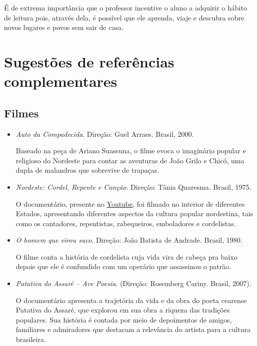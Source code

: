 \documentclass[12pt]{extarticle}
\begin{document}
É de extrema importância que o professor incentive o aluno a adquirir o hábito
de leitura pois, através dela, é possível que ele aprenda, viaje e descubra
sobre novos lugares e povos sem sair de casa.

\section{Sugestões de referências complementares}\label{sugestoes}

\subsection{Filmes}

\begin{itemize}

\item \textit{Auto da Compadecida}. Direção: Guel Arraes. Brasil, 2000.

Baseado na peça de Ariano Suassuna, o filme evoca o imaginário popular
e religioso do Nordeste para contar as aventuras de João Grilo e Chicó, uma
dupla de malandros que sobrevive de trapaças.

\item \textit{Nordeste: Cordel, Repente e Canção}. Direção: Tânia Quaresma.
  Brasil, 1975.

O documentário, presente no
\href{https://www.youtube.com/watch?v=xFOZxwBcUmo}{Youtube}, foi filmado no
interior de diferentes Estados, apresentando diferentes aspectos da cultura
popular nordestina, tais como os cantadores, repentistas, rabequeiros,
emboladores e cordelistas.

\item \textit{O homem que virou suco}. Direção: João Batista de Andrade.
  Brasil, 1980.

O filme conta a história de cordelista cuja vida vira de cabeça pra baixo
depois que ele é confundido com um operário que assassinou o patrão.

\item \textit{Patativa do Assaré -- Ave Poesia}. (Direção: Rosemberg Cariny.
  Brasil, 2007).

O documentário apresenta a trajetória da vida e da obra do poeta cearense
Patativa do Assaré, que explorou em sua obra a riqueza das tradições populares.
Sua história é contada por meio de depoimentos de amigos, familiares
e admiradores que destacam a relevância do artista para a cultura brasileira.
\end{itemize}
\end{document}
